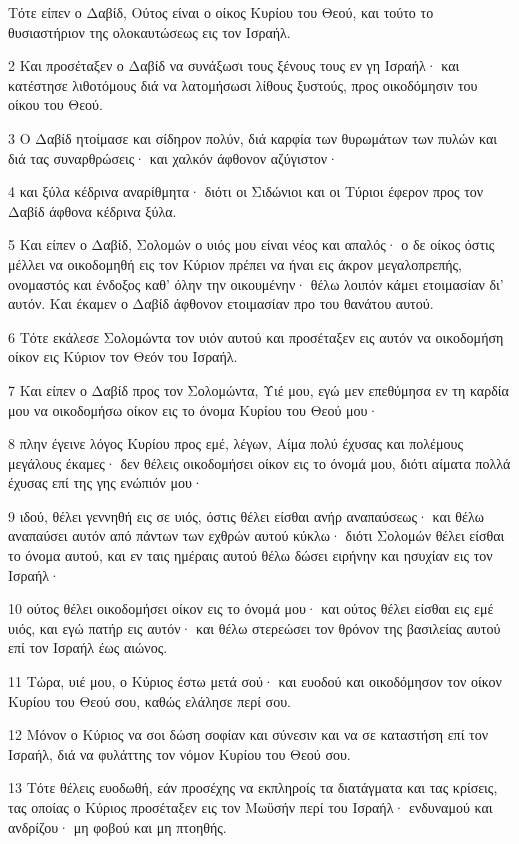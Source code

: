 \par Τότε είπεν ο Δαβίδ, Ούτος είναι ο οίκος Κυρίου του Θεού, και τούτο το θυσιαστήριον της ολοκαυτώσεως εις τον Ισραήλ.
\par 2 Και προσέταξεν ο Δαβίδ να συνάξωσι τους ξένους τους εν γη Ισραήλ· και κατέστησε λιθοτόμους διά να λατομήσωσι λίθους ξυστούς, προς οικοδόμησιν του οίκου του Θεού.
\par 3 Ο Δαβίδ ητοίμασε και σίδηρον πολύν, διά καρφία των θυρωμάτων των πυλών και διά τας συναρθρώσεις· και χαλκόν άφθονον αζύγιστον·
\par 4 και ξύλα κέδρινα αναρίθμητα· διότι οι Σιδώνιοι και οι Τύριοι έφερον προς τον Δαβίδ άφθονα κέδρινα ξύλα.
\par 5 Και είπεν ο Δαβίδ, Σολομών ο υιός μου είναι νέος και απαλός· ο δε οίκος όστις μέλλει να οικοδομηθή εις τον Κύριον πρέπει να ήναι εις άκρον μεγαλοπρεπής, ονομαστός και ένδοξος καθ' όλην την οικουμένην· θέλω λοιπόν κάμει ετοιμασίαν δι' αυτόν. Και έκαμεν ο Δαβίδ άφθονον ετοιμασίαν προ του θανάτου αυτού.
\par 6 Τότε εκάλεσε Σολομώντα τον υιόν αυτού και προσέταξεν εις αυτόν να οικοδομήση οίκον εις Κύριον τον Θεόν του Ισραήλ.
\par 7 Και είπεν ο Δαβίδ προς τον Σολομώντα, Υιέ μου, εγώ μεν επεθύμησα εν τη καρδία μου να οικοδομήσω οίκον εις το όνομα Κυρίου του Θεού μου·
\par 8 πλην έγεινε λόγος Κυρίου προς εμέ, λέγων, Αίμα πολύ έχυσας και πολέμους μεγάλους έκαμες· δεν θέλεις οικοδομήσει οίκον εις το όνομά μου, διότι αίματα πολλά έχυσας επί της γης ενώπιόν μου·
\par 9 ιδού, θέλει γεννηθή εις σε υιός, όστις θέλει είσθαι ανήρ αναπαύσεως· και θέλω αναπαύσει αυτόν από πάντων των εχθρών αυτού κύκλω· διότι Σολομών θέλει είσθαι το όνομα αυτού, και εν ταις ημέραις αυτού θέλω δώσει ειρήνην και ησυχίαν εις τον Ισραήλ·
\par 10 ούτος θέλει οικοδομήσει οίκον εις το όνομά μου· και ούτος θέλει είσθαι εις εμέ υιός, και εγώ πατήρ εις αυτόν· και θέλω στερεώσει τον θρόνον της βασιλείας αυτού επί τον Ισραήλ έως αιώνος.
\par 11 Τώρα, υιέ μου, ο Κύριος έστω μετά σού· και ευοδού και οικοδόμησον τον οίκον Κυρίου του Θεού σου, καθώς ελάλησε περί σου.
\par 12 Μόνον ο Κύριος να σοι δώση σοφίαν και σύνεσιν και να σε καταστήση επί τον Ισραήλ, διά να φυλάττης τον νόμον Κυρίου του Θεού σου.
\par 13 Τότε θέλεις ευοδωθή, εάν προσέχης να εκπληροίς τα διατάγματα και τας κρίσεις, τας οποίας ο Κύριος προσέταξεν εις τον Μωϋσήν περί του Ισραήλ· ενδυναμού και ανδρίζου· μη φοβού και μη πτοηθής.

